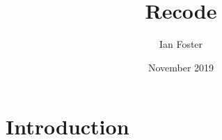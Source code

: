 \documentclass{article}
\title{Recode}
\author{Ian Foster}
\date{November 2019}
\begin{document}
\maketitle

\section{Introduction}
\end{document}
